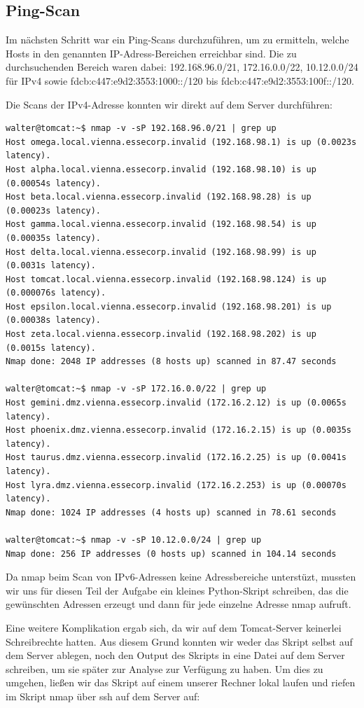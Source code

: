 \subsection{Ping-Scan}

Im nächsten Schritt war ein Ping-Scans durchzuführen, um zu ermitteln, welche Hosts in den genannten IP-Adress-Bereichen erreichbar sind. Die zu durchsuchenden Bereich waren dabei: 192.168.96.0/21, 172.16.0.0/22, 10.12.0.0/24 für IPv4 sowie fdcb:c447:e9d2:3553:1000::/120 bis fdcb:c447:e9d2:3553:100f::/120.

Die Scans der IPv4-Adresse konnten wir direkt auf dem Server durchführen:

\begin{lstlisting}
walter@tomcat:~$ nmap -v -sP 192.168.96.0/21 | grep up
Host omega.local.vienna.essecorp.invalid (192.168.98.1) is up (0.0023s latency).
Host alpha.local.vienna.essecorp.invalid (192.168.98.10) is up (0.00054s latency).
Host beta.local.vienna.essecorp.invalid (192.168.98.28) is up (0.00023s latency).
Host gamma.local.vienna.essecorp.invalid (192.168.98.54) is up (0.00035s latency).
Host delta.local.vienna.essecorp.invalid (192.168.98.99) is up (0.0031s latency).
Host tomcat.local.vienna.essecorp.invalid (192.168.98.124) is up (0.000076s latency).
Host epsilon.local.vienna.essecorp.invalid (192.168.98.201) is up (0.00038s latency).
Host zeta.local.vienna.essecorp.invalid (192.168.98.202) is up (0.0015s latency).
Nmap done: 2048 IP addresses (8 hosts up) scanned in 87.47 seconds

walter@tomcat:~$ nmap -v -sP 172.16.0.0/22 | grep up
Host gemini.dmz.vienna.essecorp.invalid (172.16.2.12) is up (0.0065s latency).
Host phoenix.dmz.vienna.essecorp.invalid (172.16.2.15) is up (0.0035s latency).
Host taurus.dmz.vienna.essecorp.invalid (172.16.2.25) is up (0.0041s latency).
Host lyra.dmz.vienna.essecorp.invalid (172.16.2.253) is up (0.00070s latency).
Nmap done: 1024 IP addresses (4 hosts up) scanned in 78.61 seconds

walter@tomcat:~$ nmap -v -sP 10.12.0.0/24 | grep up
Nmap done: 256 IP addresses (0 hosts up) scanned in 104.14 seconds
\end{lstlisting}

Da nmap beim Scan von IPv6-Adressen keine Adressbereiche unterstüzt, mussten wir uns für diesen Teil der Aufgabe ein kleines Python-Skript schreiben, das die gewünschten Adressen erzeugt und dann für jede einzelne Adresse nmap aufruft.

Eine weitere Komplikation ergab sich, da wir auf dem Tomcat-Server keinerlei Schreibrechte hatten. Aus diesem Grund konnten wir weder das Skript selbst auf dem Server ablegen, noch den Output des Skripts in eine Datei auf dem Server schreiben, um sie später zur Analyse zur Verfügung zu haben. Um dies zu umgehen, ließen wir das Skript auf einem unserer Rechner lokal laufen und riefen im Skript nmap über ssh auf dem Server auf:

